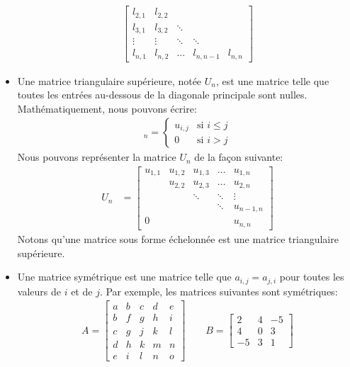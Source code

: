 \documentclass[]{book}
\theoremstyle{definition}
\theoremstyle{definition}
\theoremstyle{definition}
\theoremstyle{remark}
\begin{document}
\begin{itemize}
\begin{align*}
\begin{bmatrix}
  l_{2,1} & l_{2,2} & & & \\
  l_{3,1} & l_{3,2} & \ddots & & \\
  \vdots & \vdots & \ddots & \ddots & \\
  l_{n,1} & l_{n,2} & \ldots & l_{n,n-1} & l_{n,n} 
  \end{bmatrix}
  \end{align*}
\item
  Une matrice triangulaire supérieure, notée \(U_n\), est une matrice telle que toutes les entrées au-dessous de la diagonale principale sont nulles. Mathématiquement, nous pouvons écrire:
  \begin{align*}
  [u_{i,j}]_n = \begin{cases}
  u_{i,j} & \text{si } i \leq j \\
  0 & \text{si } i > j
  \end{cases} 
  \end{align*}
  Nous pouvons représenter la matrice \(U_n\) de la façon suivante:
  \begin{align*}
  U_n &= \begin{bmatrix}
  u_{1,1} & u_{1,2} & u_{1,3} & \ldots & u_{1,n} \\
  & u_{2,2} & u_{2,3} & \ldots & u_{2,n} \\
  & & \ddots & \ddots & \vdots \\
  & & & \ddots & u_{n-1,n} \\
  0 & & & & u_{n,n}
  \end{bmatrix}
  \end{align*}
  Notons qu'une matrice sous forme échelonnée est une matrice triangulaire supérieure.
\item
  Une matrice symétrique est une matrice telle que \(a_{i,j}=a_{j,i}\) pour toutes les valeurs de \(i\) et de \(j\). Par exemple, les matrices suivantes sont symétriques:
  \begin{align*}
  A = \begin{bmatrix}
  a & b & c & d & e \\
  b & f & g & h & i \\
  c & g & j & k & l \\
  d & h & k & m & n \\
  e & i & l & n & o
  \end{bmatrix}
  \qquad
  B = \begin{bmatrix}
  2 & 4 & -5 \\
  4 & 0 & 3 \\
  -5 & 3 & 1
  \end{bmatrix}

\end{align*}
\end{itemize}
\end{document}
